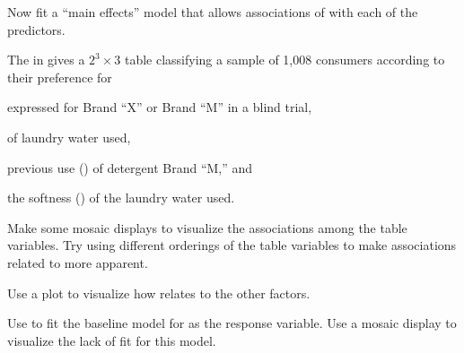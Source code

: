 \documentclass[10pt]{report}\usepackage[]{graphicx}\usepackage[]{color}
\begin{document}
\begin{Exercises}
\begin{enumerate*}
    \item Now fit a ``main effects'' model 
    that allows associations of  with each of
    the predictors.
    \begin{ans}
    \end{ans}
     
  \end{enumerate*}

  \exercise The  in  gives a $2^3 \times 3$ table classifying 
  a sample of 1,008 consumers according to their preference for  
  \begin{seriate}
    \item expressed  for Brand ``X'' or Brand ``M'' in a blind trial,
    \item {} of laundry water used,
    \item previous use () of detergent Brand ``M,'' and
    \item the softness () of the laundry water used.
  \end{seriate}
  \begin{enumerate*}
    \item Make some mosaic displays to visualize the associations among the table variables.  
    Try using different orderings of the table variables to make associations related to  more apparent.
    \begin{ans}
    \end{ans}
    
    \item Use a  plot to visualize how  relates to the other factors.
    \begin{ans}
    \end{ans}
    
    \item Use  to fit the baseline model  for  as the response variable.
    Use a mosaic display to visualize the lack of fit for this model.
    \begin{ans}
    \end{ans}
    
  \end{enumerate*}


\end{Exercises}
\end{document}
